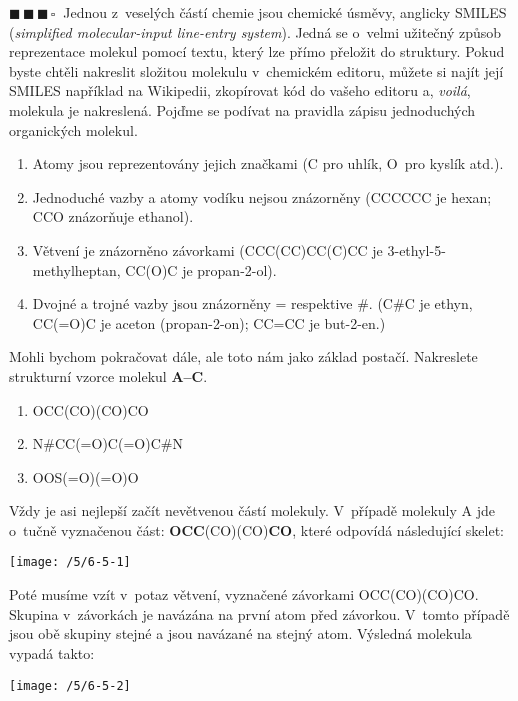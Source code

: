 \documentclass{book}
\newcommand{\tri}{$\blacksquare \, \blacksquare \, \blacksquare \, \square \; \; $}
\renewenvironment{quotation}{\par}{\par} %
\begin{document}
\hrulefill %
\begin{quotation}
\tri Jednou z~veselých částí chemie jsou chemické úsměvy, anglicky SMILES
(\textit{simplified molecular-input line-entry system}). Jedná se o~velmi
užitečný způsob reprezentace molekul pomocí textu, který lze přímo
přeložit do struktury. Pokud byste chtěli nakreslit složitou molekulu
v~chemickém editoru, můžete si najít její SMILES například na Wikipedii, zkopírovat
kód do vašeho editoru a, \textit{voilá}, molekula je nakreslená. Pojďme se podívat na pravidla
zápisu jednoduchých organických molekul.


\begin{enumerate}[label=\arabic*.]
\item Atomy jsou reprezentovány jejich značkami (C pro uhlík, O~pro kyslík
atd.).
\item Jednoduché vazby a atomy vodíku nejsou znázorněny (CCCCCC je hexan;
CCO znázorňuje ethanol).
\item Větvení je znázorněno závorkami (CCC(CC)CC(C)CC je 3-ethyl-5-methylheptan,
CC(O)C je propan-2-ol).
\item Dvojné a trojné vazby jsou znázorněny = respektive \#. (C\#C je ethyn,
CC(=O)C je aceton (propan-2-on); CC=CC je but-2-en.) 
\end{enumerate}
Mohli bychom pokračovat dále, ale toto nám jako základ postačí. Nakreslete
strukturní vzorce molekul \textbf{A--C}.


\begin{enumerate}[label=\textbf{\Alph*:}] 
\item OCC(CO)(CO)CO 
\item N\#CC(=O)C(=O)C\#N 
\item OOS(=O)(=O)O 
\end{enumerate}
\end{quotation} \dotfill \par 
Vždy je asi nejlepší začít nevětvenou částí molekuly. V~případě molekuly
A jde o~tučně vyznačenou část: \textbf{OCC}(CO)(CO)\textbf{CO}, které
odpovídá následující skelet:
\begin{center}
\texttt{[image: /5/6-5-1]} 
\par\end{center}

Poté musíme vzít v~potaz větvení, vyznačené závorkami OCC(CO)(CO)CO.
Skupina v~závorkách je navázána na první atom před závorkou. V~tomto
případě jsou obě skupiny stejné a jsou navázané na stejný atom. Výsledná
molekula vypadá takto: 
\begin{center}
\texttt{[image: /5/6-5-2]} 
\par\end{center}
\end{document}
